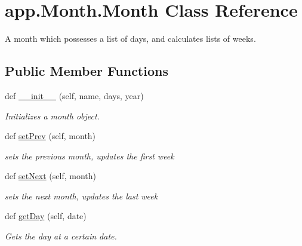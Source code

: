 \hypertarget{classapp_1_1Month_1_1Month}{}\section{app.\+Month.\+Month Class Reference}
\label{classapp_1_1Month_1_1Month}


A month which possesses a list of days, and calculates lists of weeks.  


\subsection*{Public Member Functions}
\begin{DoxyCompactItemize}
\item 
def \hyperlink{classapp_1_1Month_1_1Month_a37375e0ac2693a9b4701dacd7de23a5a}{\+\_\+\+\_\+init\+\_\+\+\_\+} (self, name, days, year)
\begin{DoxyCompactList}\small\item\em Initializes a month object. \end{DoxyCompactList}\item 
def \hyperlink{classapp_1_1Month_1_1Month_a0577a1a22deaa2fba3b7e3f4a7aecabb}{set\+Prev} (self, month)
\begin{DoxyCompactList}\small\item\em sets the previous month, updates the first week \end{DoxyCompactList}\item 
def \hyperlink{classapp_1_1Month_1_1Month_aa2f066e84d3a0118b9279ac18adc53d0}{set\+Next} (self, month)
\begin{DoxyCompactList}\small\item\em sets the next month, updates the last week \end{DoxyCompactList}\item 
def \hyperlink{classapp_1_1Month_1_1Month_aa4cb140eba9322590e2e20e6366b6ef7}{get\+Day} (self, date)
\begin{DoxyCompactList}\small\item\em Gets the day at a certain date. \end{DoxyCompactList}\end{DoxyCompactItemize}
